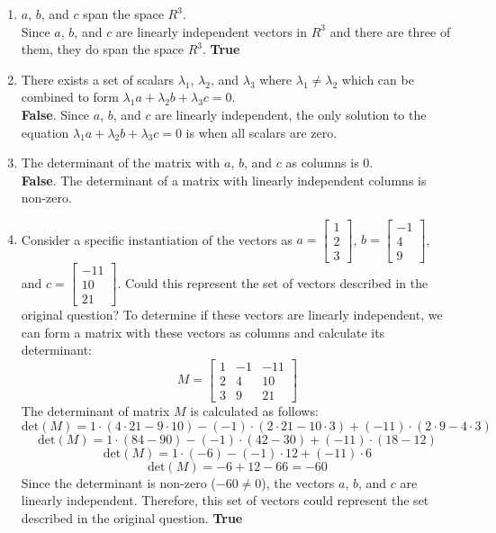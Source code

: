 \documentclass{article}
\begin{document}
\begin{enumerate}
    \item $a$, $b$, and $c$ span the space $R^3$. \\
          Since $a$, $b$, and $c$ are linearly independent vectors in $R^3$ and there are three of them, they do span the space $R^3$. \textbf{True}
    \item There exists a set of scalars $\lambda_1$, $\lambda_2$, and $\lambda_3$ where $\lambda_1 \neq \lambda_2$ which can be combined to form $\lambda_1 a + \lambda_2 b + \lambda_3 c = 0$. \\
          \textbf{False}. Since $a$, $b$, and $c$ are linearly independent, the only solution to the equation $\lambda_1 a + \lambda_2 b + \lambda_3 c = 0$ is when all scalars are zero.
    \item The determinant of the matrix with $a$, $b$, and $c$ as columns is 0. \\
          \textbf{False}. The determinant of a matrix with linearly independent columns is non-zero.
    \item Consider a specific instantiation of the vectors as $a = \begin{bmatrix}
        1 \\ 2 \\ 3
    \end{bmatrix}$, $b = \begin{bmatrix}
        -1 \\ 4 \\ 9
    \end{bmatrix}$, and $c = \begin{bmatrix}
        -11 \\ 10 \\ 21
    \end{bmatrix}$. Could this represent the set of vectors described in the original question?
        To determine if these vectors are linearly independent, we can form a matrix with these vectors as columns and calculate its determinant:
        \[M = \begin{bmatrix}
        1 & -1 & -11 \\
        2 & 4 & 10 \\
        3 & 9 & 21
        \end{bmatrix}\]
        The determinant of matrix $M$ is calculated as follows:
        \[
        \text{det}(M) = 1 \cdot (4 \cdot 21 - 9 \cdot 10) - (-1) \cdot (2 \cdot 21 - 10 \cdot 3) + (-11) \cdot (2 \cdot 9 - 4 \cdot 3)
        \]
        \[
        \text{det}(M) = 1 \cdot (84 - 90) - (-1) \cdot (42 - 30) + (-11) \cdot (18 - 12)
        \]
        \[
        \text{det}(M) = 1 \cdot (-6) - (-1) \cdot 12 + (-11) \cdot 6
        \]
        \[
        \text{det}(M) = -6 + 12 - 66 = -60
        \]
        Since the determinant is non-zero ($-60 \neq 0$), the vectors $a$, $b$, and $c$ are linearly independent. Therefore, this set of vectors could represent the set described in the original question. \textbf{True}
\end{enumerate}
\end{document}
